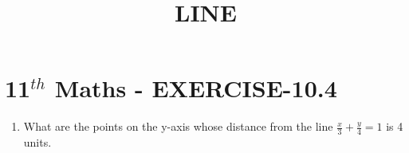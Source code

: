 \documentclass[12pt]{article}
\begin{document}
\begin{center}
\title{\textbf{LINE}}
\date{\vspace{-5ex}} %
\maketitle
\end{center}

\section{11$^{th}$ Maths - EXERCISE-10.4}
\begin{enumerate}
\item What are the points on the y-axis whose distance from the line $\frac{x}{3}+\frac{y}{4}=1$ is 4 units.
\end{enumerate}
\end{document}
